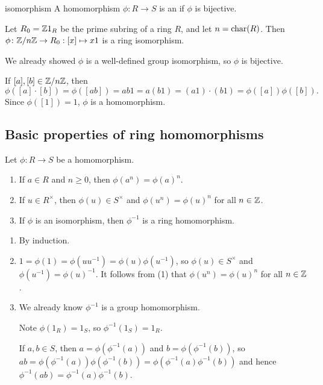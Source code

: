 \documentclass[12pt,letterpaper]{report}
\begin{document}
\begin{defn}{isomorphism}{}
  A homomorphism $\phi \colon R \to S$ is an  if $\phi$ is bijective.
\end{defn}

\begin{prop}{}{}
  Let $R_0 = \mathbb{Z}1_R$ be the prime subring of a ring $R$, and let $n = \operatorname{char}(R)$.
  Then $\phi \colon \mathbb{Z}/{n}\mathbb{Z} \to R_0 : [x] \mapsto x1$ is a ring isomorphism.
\end{prop}

\begin{thmproof}
  We already showed $\phi$ is a well-defined group isomorphism, so $\phi$ is bijective.

  If $[a], [b] \in \mathbb{Z}/{n}\mathbb{Z}$, then
  \[
    \phi([a] \cdot [b]) = \phi([ab]) = ab1 = a(b1) = (a1) \cdot (b1) = \phi([a])\phi([b]).
  \]
  Since $\phi([1]) = 1$, $\phi$ is a homomorphism.
\end{thmproof}

\pagebreak
\subsection{Basic properties of ring homomorphisms}

\begin{prop}{}{}
  Let $\phi \colon R \to S$ be a homomorphism.
  \begin{enumerate}
    \item If $a \in R$ and $n \geq 0$, then $\phi(a^n) = \phi(a)^n$.
    \item If $u \in R^\times$, then $\phi(u) \in S^\times$ and $\phi(u^n) = \phi(u)^n$ for all
      $n \in \mathbb{Z}$.
    \item If $\phi$ is an isomorphism, then $\phi^{-1}$ is a ring homomorphism.
  \end{enumerate}
\end{prop}

\begin{thmproof}
  \begin{enumerate}
    \item By induction.
    \item $1 = \phi(1) = \phi(uu^{-1}) = \phi(u)\phi(u^{-1})$, so $\phi(u) \in S^\times$ and
      $\phi(u^{-1}) = \phi(u)^{-1}$.
      It follows from (1) that $\phi(u^n) = \phi(u)^n$ for all $n \in \mathbb{Z}$.
    \item We already know $\phi^{-1}$ is a group homomorphism.

    Note $\phi(1_R) = 1_S$, so $\phi^{-1}(1_S) = 1_R$.

    If $a, b \in S$, then $a = \phi(\phi^{-1}(a))$ and $b = \phi(\phi^{-1}(b))$, so
    $ab = \phi(\phi^{-1}(a))\phi(\phi^{-1}(b)) = \phi(\phi^{-1}(a)\phi^{-1}(b))$ and hence
    $\phi^{-1}(ab) = \phi^{-1}(a)\phi^{-1}(b)$.
  \end{enumerate}
\end{thmproof}
\end{document}
